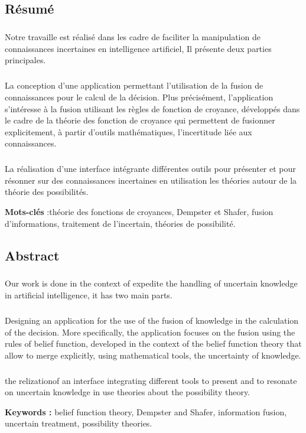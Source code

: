 \documentclass[a4paper, 12pt]{report}
\begin{document}
\begin{center}
\vspace*{4em}
\section*{Résumé}
\end{center}
\thispagestyle{empty}
\subparagraph{}
Notre travaille est réalisé dans les cadre de faciliter la manipulation de connaissances incertaines en intelligence artificiel, Il présente deux parties principales.
\subparagraph{}
La conception d'une application permettant l'utilisation de la fusion de connaissances pour le calcul de la décision. Plus précisément, l'application s'intéresse à la fusion utilisant les règles de fonction de croyance, développés dans le cadre de la théorie des fonction de croyance qui permettent de fusionner explicitement, à partir d'outils mathématiques, l'incertitude liée aux connaissances. 
\subparagraph{}
La réalisation d'une interface intégrante différentes outils pour présenter et pour résonner sur des connaissances incertaines en utilisation les théories autour de la théorie des possibilités.  \vspace{2em}
  
\textbf{ Mots-clés} :théorie des fonctions de croyances, Dempster et Shafer, fusion d'informations, traitement de l'incertain, théories de possibilité.
\begin{center}
\vspace{2em}
\section*{Abstract}
\end{center}
\subparagraph{}
Our work is done in the context of expedite the handling of uncertain knowledge in artificial intelligence, it has two main parts.
\subparagraph{}
Designing an application for the use of the fusion of knowledge in the calculation of the decision. More specifically, the application focuses on the fusion using the rules of belief function, developed in the context of the belief function theory that allow to merge explicitly, using mathematical tools, the uncertainty of knowledge.
\subparagraph{}
the relizationof an interface integrating different tools to present and to resonate on uncertain knowledge in use theories about the possibility theory. \vspace{2em}

\textbf{Keywords :} belief function theory, Dempster and Shafer, information fusion, uncertain treatment,  possibility theories.
\end{document}

